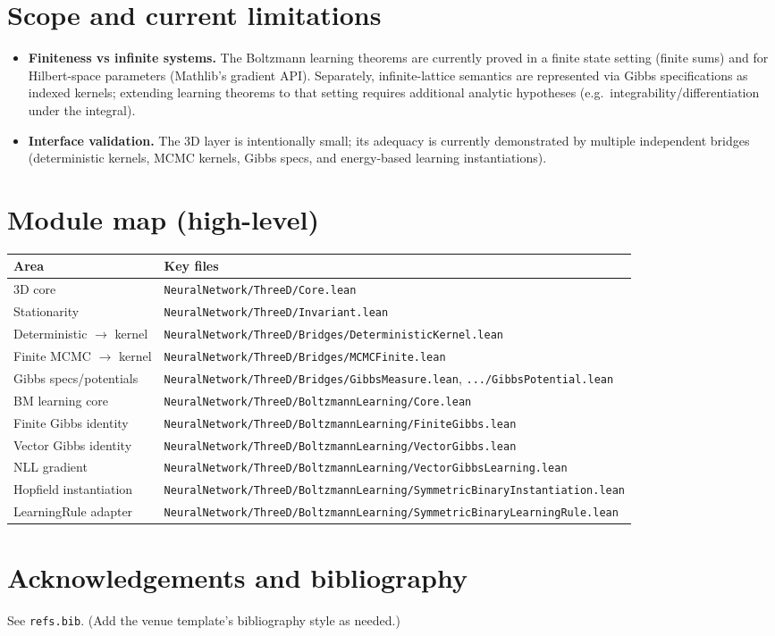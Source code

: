 \documentclass[11pt]{article}
\newcommand{\file}[1]{\texttt{#1}}
\begin{document}
\section{Scope and current limitations}
\begin{itemize}[leftmargin=2em]
\item \textbf{Finiteness vs infinite systems.} The Boltzmann learning theorems are currently
  proved in a finite state setting (finite sums) and for Hilbert-space parameters
  (Mathlib's gradient API). Separately, infinite-lattice semantics are represented via
  Gibbs specifications as indexed kernels; extending learning theorems to that setting requires
  additional analytic hypotheses (e.g.\ integrability/differentiation under the integral).
\item \textbf{Interface validation.} The 3D layer is intentionally small; its adequacy is currently
  demonstrated by multiple independent bridges (deterministic kernels, MCMC kernels, Gibbs specs,
  and energy-based learning instantiations).
\end{itemize}

\section{Module map (high-level)}
\begin{center}
\begin{tabular}{@{}ll@{}}
\toprule
Area & Key files \\
\midrule
3D core & \file{NeuralNetwork/ThreeD/Core.lean} \\
Stationarity & \file{NeuralNetwork/ThreeD/Invariant.lean} \\
Deterministic $\to$ kernel & \file{NeuralNetwork/ThreeD/Bridges/DeterministicKernel.lean} \\
Finite MCMC $\to$ kernel & \file{NeuralNetwork/ThreeD/Bridges/MCMCFinite.lean} \\
Gibbs specs/potentials & \file{NeuralNetwork/ThreeD/Bridges/GibbsMeasure.lean}, \file{.../GibbsPotential.lean} \\
BM learning core & \file{NeuralNetwork/ThreeD/BoltzmannLearning/Core.lean} \\
Finite Gibbs identity & \file{NeuralNetwork/ThreeD/BoltzmannLearning/FiniteGibbs.lean} \\
Vector Gibbs identity & \file{NeuralNetwork/ThreeD/BoltzmannLearning/VectorGibbs.lean} \\
NLL gradient & \file{NeuralNetwork/ThreeD/BoltzmannLearning/VectorGibbsLearning.lean} \\
Hopfield instantiation & \file{NeuralNetwork/ThreeD/BoltzmannLearning/SymmetricBinaryInstantiation.lean} \\
LearningRule adapter & \file{NeuralNetwork/ThreeD/BoltzmannLearning/SymmetricBinaryLearningRule.lean} \\
\bottomrule
\end{tabular}
\end{center}

\section*{Acknowledgements and bibliography}
See \file{refs.bib}. (Add the venue template's bibliography style as needed.)



\end{document}
